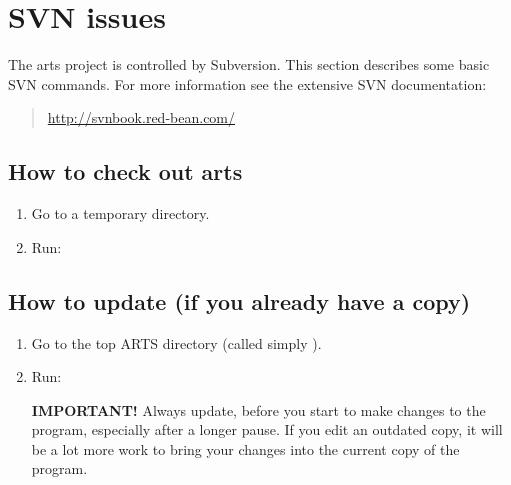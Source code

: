 \section{SVN issues}
 \label{sec:development:cvs}

The arts project is controlled by Subversion. This section describes some
basic SVN commands. For more information see the extensive SVN
documentation:
\begin{quote}
  \url{http://svnbook.red-bean.com/}
\end{quote}




\subsection{How to check out arts}
\begin{enumerate}
\item Go to a temporary directory.
\item Run: 
\end{enumerate}


\subsection{How to update (if you already have a copy)}
\begin{enumerate}
\item Go to the top ARTS directory (called simply ).
\item Run: 
   
  \textbf{IMPORTANT!} Always update, before you start to make changes
  to the program, especially after a longer pause. If you edit an
  outdated copy, it will be a lot more work to bring your changes into
  the current copy of the program.
\end{enumerate}



